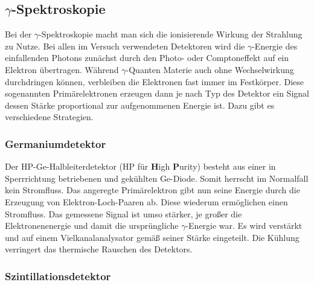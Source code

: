 



	\subsection{$\gamma$-Spektroskopie} %
	\label{sub:gamma_spektroskopie}
		
		Bei der $\gamma$-Spektroskopie macht man sich die ionisierende Wirkung der Strahlung zu Nutze.
		Bei allen im Versuch verwendeten Detektoren wird die $\gamma$-Energie des einfallenden Photons zunächst durch den Photo- oder Comptoneffekt auf ein Elektron übertragen.
		Während $\gamma$-Quanten Materie auch ohne Wechselwirkung durchdringen können, verbleiben die Elektronen fast immer im Festkörper.
		Diese sogenannten Primärelektronen erzeugen dann je nach Typ des Detektor ein Signal dessen Stärke proportional zur aufgenommenen Energie ist.
		Dazu gibt es verschiedene Strategien.

		\subsubsection{Germaniumdetektor}
		\label{sssec:ge-detektor}
		
			Der HP-Ge-Halbleiterdetektor (HP für \textbf{H}igh \textbf{P}urity) besteht aus einer in Sperrrichtung betriebenen und gekühlten Ge-Diode. 
			Somit herrscht im Normalfall kein Stromfluss.
			Das angeregte Primärelektron gibt nun seine Energie durch die Erzeugung von Elektron-Loch-Paaren ab.
			Diese wiederum ermöglichen einen Stromfluss.
			Das gemessene Signal ist umso stärker, je großer die Elektronenenergie und damit die ursprüngliche $\gamma$-Energie war.
			Es wird verstärkt und auf einem Vielkanalanalysator gemäß seiner Stärke eingeteilt.
			Die Kühlung verringert das thermische Rauschen des Detektors.



		\subsubsection{Szintillationsdetektor}
		\label{sssec:szintillationsdetektor}
		
